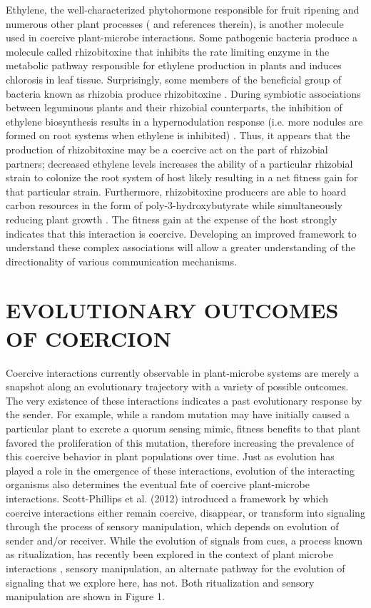 \documentclass[PhD]{msu-thesis}
\begin{document}
Ethylene, the well-characterized phytohormone responsible for fruit ripening and numerous other plant processes (\cite{bleecker2000} and references therein), is another molecule used in coercive plant-microbe interactions. Some pathogenic bacteria produce a molecule called rhizobitoxine that inhibits the rate limiting enzyme in the metabolic pathway responsible for ethylene production in plants \cite{yasuta1999} and induces chlorosis in leaf tissue. Surprisingly, some members of the beneficial group of bacteria known as rhizobia produce rhizobitoxine \cite{yuhashi2000}. During symbiotic associations between leguminous plants and their rhizobial counterparts, the inhibition of ethylene biosynthesis results in a hypernodulation response (i.e. more nodules are formed on root systems when ethylene is inhibited) \cite{penmetsa1997}. Thus, it appears that the production of rhizobitoxine may be a coercive act on the part of rhizobial partners; decreased ethylene levels increases the ability of a particular rhizobial strain to colonize the root system of host likely resulting in a net fitness gain for that particular strain. Furthermore, rhizobitoxine producers are able to hoard carbon resources in the form of poly-3-hydroxybutyrate while simultaneously reducing plant growth \cite{ratcliff2009}. The fitness gain at the expense of the host strongly indicates that this interaction is coercive. Developing an improved framework to understand these complex associations will allow a greater understanding of the directionality of various communication mechanisms. 

\section{EVOLUTIONARY OUTCOMES OF COERCION}
Coercive interactions currently observable in plant-microbe systems are merely a snapshot along an evolutionary trajectory with a variety of possible outcomes. The very existence of these interactions indicates a past evolutionary response by the sender. For example, while a random mutation may have initially caused a particular plant to excrete a quorum sensing mimic, fitness benefits to that plant favored the proliferation of this mutation, therefore increasing the prevalence of this coercive behavior in plant populations over time. 
Just as evolution has played a role in the emergence of these interactions, evolution of the interacting organisms also determines the eventual fate of coercive plant-microbe interactions. Scott-Phillips et al. (2012) introduced a framework by which coercive interactions either remain coercive, disappear, or transform into signaling through the process of sensory manipulation, which depends on evolution of sender and/or receiver. While the evolution of signals from cues, a process known as ritualization, has recently been explored in the context of plant microbe interactions \cite{padje2016}, sensory manipulation, an alternate pathway for the evolution of signaling that we explore here, has not. Both ritualization and sensory manipulation are shown in Figure 1. 
\end{document}
